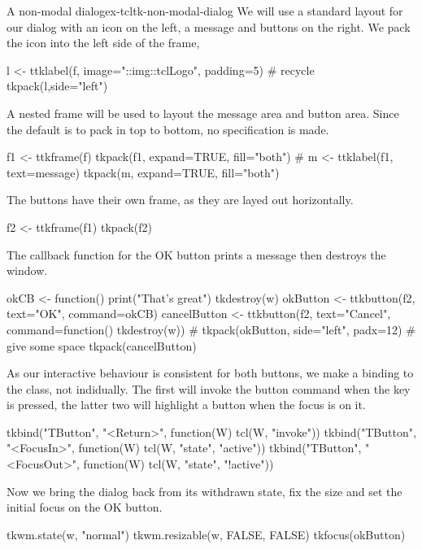 \begin{example}{A non-modal dialog}{ex-tcltk-non-modal-dialog}
We will use a standard layout for our dialog with an icon on the left,
a message and buttons on the right. We pack the icon into the left side of the frame,
\begin{Schunk}
\begin{Sinput}
 l <- ttklabel(f, image="::img::tclLogo", padding=5) # recycle
 tkpack(l,side="left")
\end{Sinput}
\end{Schunk}

A nested frame will be used to layout the message area and button area. Since the  default is to pack in top to bottom, no  specification is made.
\begin{Schunk}
\begin{Sinput}
 f1 <- ttkframe(f)
 tkpack(f1, expand=TRUE, fill="both")
 #
 m <- ttklabel(f1, text=message)
 tkpack(m, expand=TRUE, fill="both")
\end{Sinput}
\end{Schunk}

The buttons have their own frame, as they are layed out horizontally. 
\begin{Schunk}
\begin{Sinput}
 f2 <- ttkframe(f1)
 tkpack(f2)
\end{Sinput}
\end{Schunk}
%
The callback function for the OK button prints a message then destroys the window.
\begin{Schunk}
\begin{Sinput}
 okCB <- function() {
   print("That's great")
   tkdestroy(w)
 }
 okButton <- ttkbutton(f2, text="OK", command=okCB)
 cancelButton <- ttkbutton(f2, text="Cancel", 
                           command=function() tkdestroy(w))
 #
 tkpack(okButton, side="left", padx=12)  # give some space
 tkpack(cancelButton)
\end{Sinput}
\end{Schunk}
%

As our interactive behaviour is consistent for both buttons, we make a
binding to the  class, not indidually. The first will
invoke the button command when the  key is pressed, the
latter two will highlight a button when the focus is on it.
\begin{Schunk}
\begin{Sinput}
 tkbind("TButton", "<Return>", function(W) tcl(W, "invoke"))
 tkbind("TButton", "<FocusIn>", function(W) tcl(W, "state", "active"))
 tkbind("TButton", "<FocusOut>", function(W) tcl(W, "state", "!active"))
\end{Sinput}
\end{Schunk}
%
Now we bring the dialog back from its withdrawn state, fix the size
and set the initial focus on the OK button.
\begin{Schunk}
\begin{Sinput}
 tkwm.state(w, "normal")
 tkwm.resizable(w, FALSE, FALSE)
 tkfocus(okButton)
\end{Sinput}
\end{Schunk}
\end{example}

